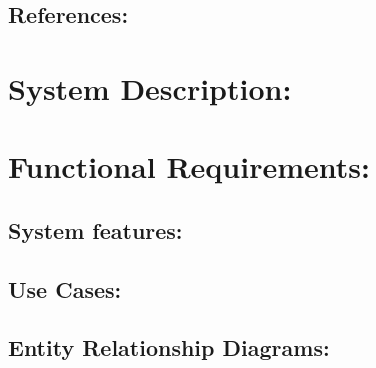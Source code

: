 \documentclass[12pt]{article}
\begin{document}
		
	
	\vspace{0.2in}
	
		\subsection{References:}
		\vspace{0.1in}
			
	
	\vspace{0.5in}
	
	\section{System Description:} %
	\vspace{0.2in}
	
	
	
	\vspace{0.5in}
	
	\newpage
	\section{Functional Requirements:}
	\vspace{0.2in}
		
		\subsection{System features:} %
		\vspace{0.1in}
		
		
	\vspace{0.2in}
	
		\subsection{Use Cases:} %
		\vspace{0.1in}
		
		
		
	\vspace{0.2in}
	
		\subsection{Entity Relationship Diagrams:}
		\vspace{0.2in}
		
\end{document}
